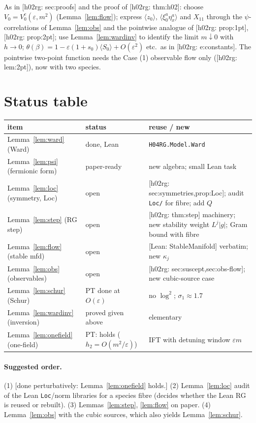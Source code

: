 \documentclass[11pt]{article}
\theoremstyle{definition}
\theoremstyle{remark}
\newcommand{\avg}[1]{\langle #1\rangle}
\newcommand{\eps}{\varepsilon}
\newcommand{\reuse}[1]{\textsf{[h02rg: #1]}}
\newcommand{\lean}[1]{\textsf{[Lean: #1]}}
\begin{document}
As in \reuse{sec:proofs} and the proof of \reuse{thm:h02}: choose $V_0=V_0^c(\eps,m^2)$
(Lemma~\ref{lem:flow}); express $\avg{z_0}$, $\avg{\xi^a_0\eta^a_x}$ and $X_{11}$ through the
$\psi$-correlations of Lemma~\ref{lem:obs} and the pointwise analogue of
\reuse{prop:1pt}, \reuse{prop:2pt}; use Lemma~\ref{lem:wardinv} to identify the limit $m\downarrow0$
with $h\to0$; $\theta(\beta)=1-\eps(1+s_0)\avg{S_0}+O(\eps^2)$ etc.\ as in \reuse{e:constants}.
The pointwise two-point function needs the Case (1) observable flow only (\reuse{lem:2pt}),
now with two species.

\section{Status table}

\begin{center}
\small
\begin{tabular}{p{4.2cm}p{3.6cm}p{6.6cm}}
  \toprule
  item & status & reuse / new\\
  \midrule
  Lemma~\ref{lem:ward} (Ward) & done, Lean & \texttt{H04RG.Model.Ward}\\
  Lemma~\ref{lem:psi} (fermionic form) & paper-ready & new algebra; small Lean task\\
  Lemma~\ref{lem:loc} (symmetry, Loc) & open & \reuse{sec:symmetries,prop:Loc}; audit \texttt{Loc/} for fibre; add $Q$\\
  Lemma~\ref{lem:step} (RG step) & open & \reuse{thm:step} machinery; new stability weight $L^j|g|$; Gram bound with fibre\\
  Lemma~\ref{lem:flow} (stable mfd) & open & \lean{StableManifold} verbatim; new $\kappa_j$\\
  Lemma~\ref{lem:obs} (observables) & open & \reuse{sec:suscept,sec:obs-flow}; new cubic-source case\\
  Lemma~\ref{lem:schur} (Schur) & PT done at $O(\eps)$ & no $\log^2$; $\sigma_1\approx1.7$\\
  Lemma~\ref{lem:wardinv} (inversion) & proved given above & elementary\\
  Lemma~\ref{lem:onefield} (one-field) & PT: holds ($h_2=O(m^2/\eps)$) & IFT with detuning window $\eps m$\\
  \bottomrule
\end{tabular}
\end{center}

\paragraph{Suggested order.} (1) [done perturbatively: Lemma~\ref{lem:onefield} holds.] (2) Lemma~\ref{lem:loc} audit of the Lean \texttt{Loc}/norm libraries for
a species fibre (decides whether the Lean RG is reused or rebuilt). (3) Lemmas~\ref{lem:step},
\ref{lem:flow} on paper. (4) Lemma~\ref{lem:obs} with the cubic sources, which also yields
Lemma~\ref{lem:schur}.
\end{document}

